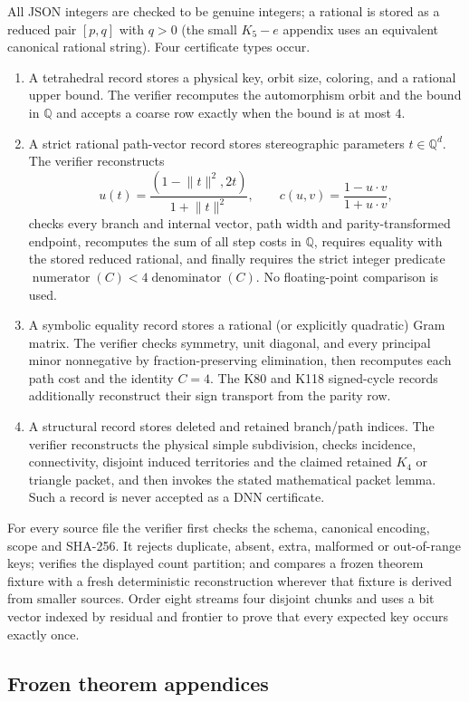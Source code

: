 \documentclass[11pt]{article}
\theoremstyle{remark}
\begin{document}
All JSON integers are checked to be genuine integers; a rational is stored as a
reduced pair $[p,q]$ with $q>0$ (the small $K_5-e$ appendix uses an equivalent
canonical rational string).  Four certificate types occur.
\begin{enumerate}
\item A tetrahedral record stores a physical key, orbit size, coloring, and a
rational upper bound.  The verifier recomputes the automorphism orbit and the
bound in $\mathbb Q$ and accepts a coarse row exactly when the bound is at most
$4$.
\item A strict rational path-vector record stores stereographic parameters
$t\in\mathbb Q^d$.  The verifier reconstructs
\[
 u(t)=\frac{(1-\lVert t\rVert^2,2t)}{1+\lVert t\rVert^2},\qquad
 c(u,v)=\frac{1-u\cdot v}{1+u\cdot v},
\]
checks every branch and internal vector, path width and parity-transformed
endpoint, recomputes the sum of all step costs in \(\mathbb Q\), requires
equality with the stored reduced rational, and finally requires the strict
integer predicate $\operatorname{numerator}(C)<4\operatorname{denominator}(C)$.
No floating-point comparison is used.
\item A symbolic equality record stores a rational (or explicitly quadratic)
Gram matrix.  The verifier checks symmetry, unit diagonal, and every principal
minor nonnegative by fraction-preserving elimination, then recomputes each path
cost and the identity $C=4$.  The K80 and K118 signed-cycle records additionally
reconstruct their sign transport from the parity row.
\item A structural record stores deleted and retained branch/path indices.  The
verifier reconstructs the physical simple subdivision, checks incidence,
connectivity, disjoint induced territories and the claimed retained $K_4$ or
triangle packet, and then invokes the stated mathematical packet lemma.  Such a
record is never accepted as a DNN certificate.
\end{enumerate}
For every source file the verifier first checks the schema, canonical encoding,
scope and SHA-256.  It rejects duplicate, absent, extra, malformed or
out-of-range keys; verifies the displayed count partition; and compares a
frozen theorem fixture with a fresh deterministic reconstruction wherever that
fixture is derived from smaller sources.  Order eight streams four disjoint
chunks and uses a bit vector indexed by residual and frontier to prove that
every expected key occurs exactly once.

\subsection{Frozen theorem appendices}
\end{document}
